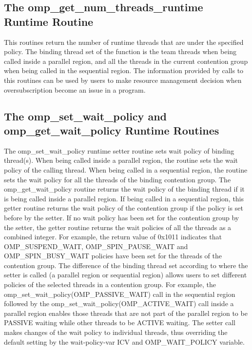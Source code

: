 \subsection{The {\sf omp\_get\_num\_threads\_runtime} Runtime Routine}
This routines return the number of runtime threads that are under the specified policy. The binding thread set 
of the function is the team threads when being called inside a {\sf parallel} region, and all the threads in the current 
contention group when being called in the sequential region. The information provided by calls to this routines can be used 
by users to make resource management decision when oversubscription become an issue in a program. 

\subsection{The {\sf omp\_set\_wait\_policy} and {\sf omp\_get\_wait\_policy} Runtime Routines}
The {\sf omp\_set\_wait\_policy} runtime setter routine sets wait policy of binding thread(s). 
When being called inside a {\sf parallel} region, the routine sets the wait policy of the calling thread. 
When being called in a sequential region, the routine sets the wait policy for all the 
 threads of the binding contention group. The {\sf omp\_get\_wait\_policy} routine returns the wait policy 
of the binding thread if it is being called inside a {\sf parallel} region. If being called in a sequential region, 
this getter routine returns the wait policy of the contention group if the policy is set before by the setter. 
If no wait policy has been set for the contention group by the setter, the getter routine returns the wait policies 
of all the threads as a combined integer. For example, the return value of 0x1011 indicates that {\sf OMP\_SUSPEND\_WAIT}, 
{\sf OMP\_SPIN\_PAUSE\_WAIT} and {\sf OMP\_SPIN\_BUSY\_WAIT} policies have been set for the threads of the contention group. The
difference of the binding thread set according to where the setter is called (a {\sf parallel} region or sequential region) 
allows users to set different policies of the selected threads in a contention group. 
For example, the {\sf omp\_set\_wait\_policy(OMP\_PASSIVE\_WAIT)} 
call in the sequential region followed by the {\sf omp\_set\_wait\_policy(OMP\_ACTIVE\_WAIT)}  
call inside a {\sf parallel} region enables those threads that are not part of the {\sf parallel} region to be {\sf PASSIVE} 
waiting while other threads to be {\sf ACTIVE} waiting. 
The setter call makes changes of the wait policy to individual threads, thus overriding the default 
setting by the {\sf wait-policy-var} ICV and {\sf OMP\_WAIT\_POLICY} variable. 

